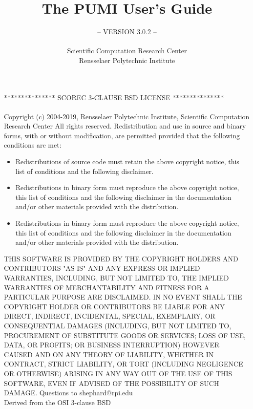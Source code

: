 \documentclass[11pt]{article}  %
\author{}
\title{}
\title{The PUMI User's Guide}
\author{-- VERSION 3.0.2 --\\
\\
Scientific Computation Research Center \\
Rensselaer Polytechnic Institute}
\begin{document}
\maketitle


\newpage

\newpage
***************     SCOREC 3-CLAUSE BSD LICENSE     ***************
\\
\\
Copyright (c) 2004-2019, Rensselaer Polytechnic Institute, Scientific Computation Research Center
All rights reserved.
\newline
\newline
Redistribution and use in source and binary forms, with or without
modification, are permitted provided that the following conditions are met:

\begin{itemize}
\item Redistributions of source code must retain the above copyright notice,
  this list of conditions and the following disclaimer.

\item Redistributions in binary form must reproduce the above copyright notice,
  this list of conditions and the following disclaimer in the documentation
  and/or other materials provided with the distribution.

\item Redistributions in binary form must reproduce the above copyright notice,
  this list of conditions and the following disclaimer in the documentation
  and/or other materials provided with the distribution.
\end{itemize}

THIS SOFTWARE IS PROVIDED BY THE COPYRIGHT HOLDERS AND CONTRIBUTORS "AS IS"
AND ANY EXPRESS OR IMPLIED WARRANTIES, INCLUDING, BUT NOT LIMITED TO, THE
IMPLIED WARRANTIES OF MERCHANTABILITY AND FITNESS FOR A PARTICULAR PURPOSE ARE
DISCLAIMED. IN NO EVENT SHALL THE COPYRIGHT HOLDER OR CONTRIBUTORS BE LIABLE
FOR ANY DIRECT, INDIRECT, INCIDENTAL, SPECIAL, EXEMPLARY, OR CONSEQUENTIAL
DAMAGES (INCLUDING, BUT NOT LIMITED TO, PROCUREMENT OF SUBSTITUTE GOODS OR
SERVICES; LOSS OF USE, DATA, OR PROFITS; OR BUSINESS INTERRUPTION) HOWEVER
CAUSED AND ON ANY THEORY OF LIABILITY, WHETHER IN CONTRACT, STRICT LIABILITY,
OR TORT (INCLUDING NEGLIGENCE OR OTHERWISE) ARISING IN ANY WAY OUT OF THE USE
OF THIS SOFTWARE, EVEN IF ADVISED OF THE POSSIBILITY OF SUCH DAMAGE.
\newline
\newline
Questions to shephard@rpi.edu\\
Derived from the OSI 3-clause BSD
\newpage
\newpage

\tableofcontents
\newpage





%













%
%
%
\end{document}
